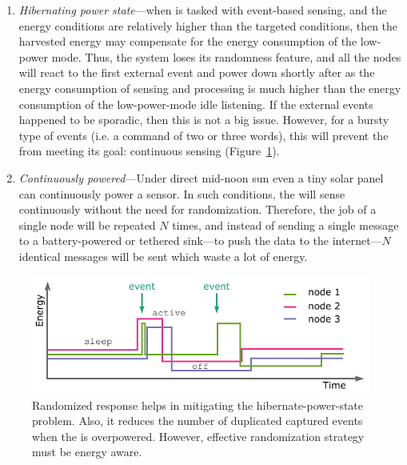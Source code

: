 \begin{enumerate}
\begin{figure}
		\label{fig:noRand}
\end{figure} 
%
		\item \label{it:hibernating} \textit{Hibernating power state}---when \sys is tasked with event-based sensing, and the energy conditions are relatively higher than the targeted conditions, then the harvested energy may compensate for the energy consumption of the low-power mode. Thus, the system loses its randomness feature, and all the nodes will react to the first external event and power down shortly after as the energy consumption of sensing and processing is much higher than the energy consumption of the low-power-mode idle listening. If the external events happened to be sporadic, then this is not a big issue. However, for a bursty type of events (i.e. a command of two or three words), this will prevent the \sys from meeting its goal: continuous sensing (Figure~\ref{fig:noRand}). 
		\item \label{it:continuous} \textit{Continuously powered}---Under direct mid-noon sun even a tiny solar panel can continuously power a sensor. In such conditions, the \sys will sense continuously without the need for randomization. Therefore, the job of a single node will be repeated $N$ times, and instead of sending a single message to a battery-powered or tethered sink---to push the data to the internet---$N$ identical messages will be sent which waste a lot of energy. 
				
\end{enumerate}
%
\begin{figure}
		\centering
		\includegraphics[width=\columnwidth]{figures/randomized_response}
		\caption{Randomized response helps in mitigating the hibernate-power-state problem. Also, it reduces the number of duplicated captured events when the \sys is overpowered. However, effective randomization strategy must be energy aware.}
		\label{fig:rand}
\end{figure} 
